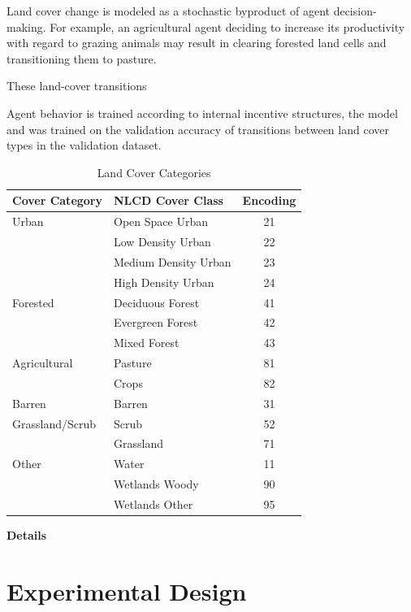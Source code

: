 Land cover change is modeled as a stochastic byproduct of agent
decision-making.
For example,
an agricultural agent deciding to increase its productivity
with regard to grazing animals may result in clearing forested land cells
and transitioning them to pasture.

These land-cover transitions 

Agent behavior is trained according to internal incentive structures,
the model and was trained on the validation accuracy of transitions
between land cover types in the validation dataset.

\begin{table}
\centering
\caption{Land Cover Categories}
\begin{tabular}{llc}
\hline
\hline
    Cover Category & NLCD Cover Class & Encoding \\
\hline
    Urban & Open Space Urban & 21 \\
    & Low Density Urban & 22 \\
    & Medium Density Urban & 23 \\
    & High Density Urban & 24 \\
    Forested & Deciduous Forest & 41 \\
    & Evergreen Forest & 42 \\
    & Mixed Forest & 43 \\
    Agricultural 
    & Pasture & 81 \\
    & Crops & 82\\
    Barren & Barren & 31 \\
    Grassland/Scrub & Scrub & 52 \\
    & Grassland & 71 \\
    Other & Water & 11 \\
    & Wetlands Woody & 90 \\
    & Wetlands Other & 95 \\
\hline
\end{tabular}
\end{table}

\textbf{Details}


\section{Experimental Design}
\label{sec:land_exp}

